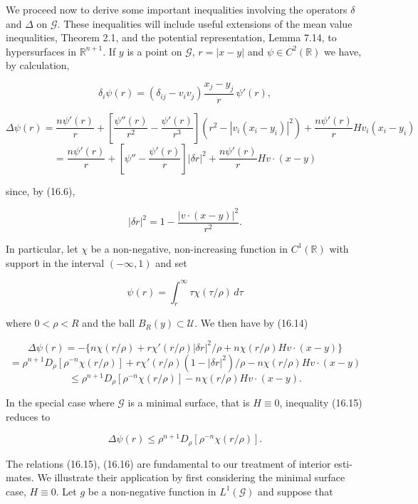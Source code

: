 
We proceed now to derive some important inequalities involving the operators
$\delta$ and $\Delta$ on $\mathcal{G}$. These inequalities will include useful extensions of the mean value
inequalities, Theorem 2.1, and the potential representation, Lemma 7.14, to
hypersurfaces in $\mathbb{R}^{n+1}$. If $y$ is a point on $\mathcal{G}$, $r = |x-y|$ and $\psi \in C^2(\mathbb{R})$ we have,
by calculation,

\[
\delta_i\psi(r) = (\delta_{ij} - v_i v_j)\frac{x_j-y_j}{r}\,\psi'(r),
\]

\begin{equation}
\Delta\psi(r) = \frac{n\psi'(r)}{r} + \left[\frac{\psi''(r)}{r^2} - \frac{\psi'(r)}{r^3}\right](r^2 - |v_i(x_i-y_i)|^2) + \frac{n\psi'(r)}{r} H v_i(x_i-y_i)
\tag{16.14}
\end{equation}
\[
= \frac{n\psi'(r)}{r} + \left[\psi'' - \frac{\psi'(r)}{r}\right]|\delta r|^2 + \frac{n\psi'(r)}{r} H v\cdot(x-y)
\]

since, by (16.6),

\[
|\delta r|^2 = 1 - \frac{|v\cdot(x-y)|^2}{r^2}.
\]

In particular, let $\chi$ be a non-negative, non-increasing function in $C^1(\mathbb{R})$ with
support in the interval $(-\infty, 1)$ and set

\[
\psi(r) = \int_r^\infty \tau\chi(\tau/\rho)\, d\tau
\]

where $0 < \rho < R$ and the ball $B_R(y) \subset \mathcal{U}$. We then have by (16.14)

\begin{equation}
\Delta\psi(r) = -\{n\chi(r/\rho) + r\chi'(r/\rho)|\delta r|^2/\rho + n\chi(r/\rho)Hv\cdot(x-y)\}
\tag{16.15}
\end{equation}
\[
= \rho^{n+1}D_\rho[\rho^{-n}\chi(r/\rho)] + r\chi'(r/\rho)(1-|\delta r|^2)/\rho - n\chi(r/\rho)Hv\cdot(x-y)
\]
\[
\leq \rho^{n+1}D_\rho[\rho^{-n}\chi(r/\rho)] - n\chi(r/\rho)Hv\cdot(x-y).
\]

In the special case where $\mathcal{G}$ is a minimal surface, that is $H \equiv 0$, inequality (16.15)
reduces to

\begin{equation}
\Delta\psi(r) \leq \rho^{n+1}D_\rho[\rho^{-n}\chi(r/\rho)].
\tag{16.16}
\end{equation}

The relations (16.15), (16.16) are fundamental to our treatment of interior esti-
mates. We illustrate their application by first considering the minimal surface case,
$H \equiv 0$. Let $g$ be a non-negative function in $L^1(\mathcal{G})$ and suppose that

